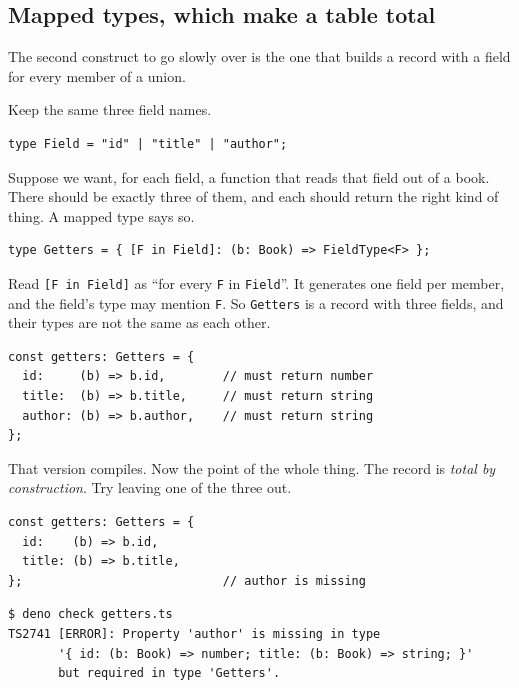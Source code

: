 \documentclass[11pt,a4paper]{article}
\begin{document}
\begin{pinkbox}
\subsection{Mapped types, which make a table total}
\label{sec:mapped}

The second construct to go slowly over is the one that builds a record with a field for every
member of a union.

Keep the same three field names.

\begin{lstlisting}[language=TS]
type Field = "id" | "title" | "author";
\end{lstlisting}

Suppose we want, for each field, a function that reads that field out of a book. There should be
exactly three of them, and each should return the right kind of thing. A mapped type says so.

\begin{lstlisting}[language=TS]
type Getters = { [F in Field]: (b: Book) => FieldType<F> };
\end{lstlisting}

Read \texttt{[F in Field]} as ``for every \texttt{F} in \texttt{Field}''. It generates one field
per member, and the field's type may mention \texttt{F}. So \texttt{Getters} is a record with three
fields, and their types are not the same as each other.

\begin{lstlisting}[language=TS]
const getters: Getters = {
  id:     (b) => b.id,        // must return number
  title:  (b) => b.title,     // must return string
  author: (b) => b.author,    // must return string
};
\end{lstlisting}

That version compiles. Now the point of the whole thing. The record is \emph{total by
construction}. Try leaving one of the three out.

\begin{lstlisting}[language=TS]
const getters: Getters = {
  id:    (b) => b.id,
  title: (b) => b.title,
};                            // author is missing
\end{lstlisting}

\begin{lstlisting}[language=SH]
$ deno check getters.ts
TS2741 [ERROR]: Property 'author' is missing in type
       '{ id: (b: Book) => number; title: (b: Book) => string; }'
       but required in type 'Getters'.
\end{lstlisting}


\end{pinkbox}
\end{document}
